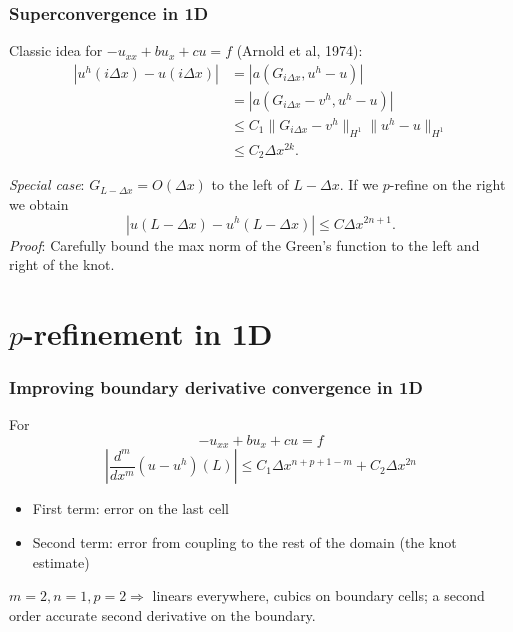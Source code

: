 \documentclass[8pt]{beamer}
\begin{document}
\begin{frame}
    \frametitle{Superconvergence in 1D}
    Classic idea for \(-u_{xx} + b u_x + c u = f\) (Arnold et al, 1974):
    \pause
    \begin{align*}
        |u^h(i \Delta x) - u(i \Delta x)|
        &= |a(G_{i\Delta x}, u^h - u)|                                        \\
        &= |a(G_{i\Delta x} - v^h, u^h - u)|                                  \\
        &\leq C_1 \|G_{i\Delta x} - v^h\|_{H^1} \|u^h - u\|_{H^1}             \\
        &\leq C_2 \Delta x^{2 k}.
    \end{align*}

    \pause
    \emph{Special case}: \(G_{L - \Delta x} = O(\Delta x)\) to the left of \(L -
    \Delta x\). If we \(p\)-refine on the right we obtain
    \begin{equation*}
        |u(L - \Delta x) - u^h(L - \Delta x)| \leq C \Delta x^{2 n + 1}.
    \end{equation*}
    \emph{Proof}: Carefully bound the max norm of the Green's function to the
    left and right of the knot.
\end{frame}

\section{\(p\)-refinement in 1D}
\begin{frame}
    \frametitle{Improving boundary derivative convergence in 1D}
    For
    \begin{equation*}
        -u_{xx} + b u_x + c u = f
    \end{equation*}
    \pause
    \begin{equation*}
        \left|\dfrac{d^m}{dx^m}(u - u^h)(L)\right|
        \leq C_1 \Delta x^{n + p + 1 - m}
        + C_2 \Delta x^{2 n}
    \end{equation*}
    \pause
    \begin{itemize}
        \item First term: error on the last cell
        \item Second term: error from coupling to the rest of the domain (the
              knot estimate)
    \end{itemize}
    \pause
    \begin{center}
        \(m = 2, n = 1, p = 2 \Rightarrow\) linears everywhere, cubics on
        boundary cells; a second order accurate second derivative on the
        boundary.
    \end{center}
\end{frame}
\end{document}
